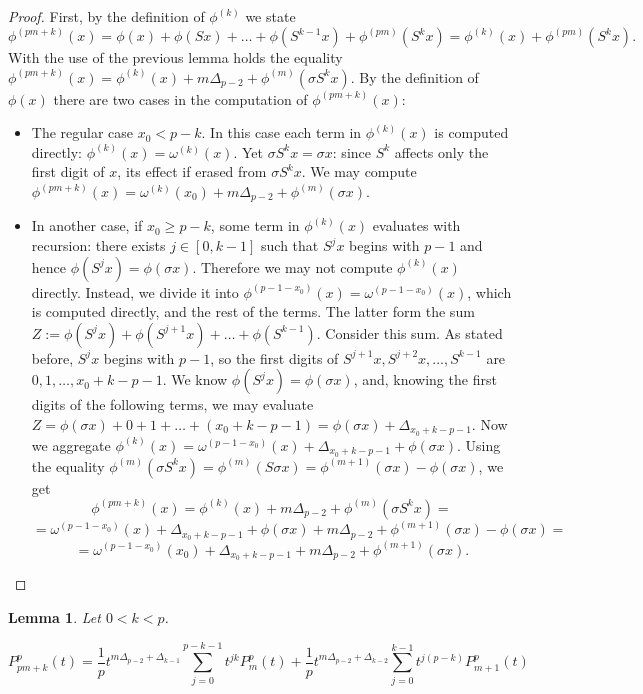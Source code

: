 \documentclass[a4paper]{article}
\theoremstyle{plain}
\newtheorem{lemma}{Lemma}[section]
\theoremstyle{definition}
\begin{document}
\begin{proof}
First, by the definition of $\phi^(k)$ we state $$\phi^{(pm+k)}(x) = \phi(x) + \phi(Sx) + \ldots + \phi(S^{k-1}x) + \phi^{(pm)}(S^k x)= \phi^{(k)}(x) + \phi^{(pm)}(S^k x).$$
With the use of the previous lemma holds the equality $\phi^{(pm+k)}(x) =  \phi^{(k)}(x) + m\Delta_{p-2} + \phi^{(m)}(\sigma S^k x)$.
By the definition of $\phi(x)$ there are two cases in the computation of $\phi^{(pm+k)}(x)$:
\begin{itemize}
\item The regular case $x_0 < p-k $. In this case each term in $\phi^{(k)}(x)$ is computed directly: $\phi^{(k)}(x) = \omega^{(k)}(x)$. Yet $\sigma S^k x = \sigma x$: since $S^k$ affects only the first digit of $x$, its effect if erased from $\sigma S^k x$. We may compute $\phi^{(pm+k)}(x)=\omega^{(k)}(x_0)+m\Delta_{p-2}+\phi^{(m)}(\sigma x)$.
\item In another case, if $x_0 \ge p-k $, some term  in $\phi^{(k)}(x)$ evaluates with recursion: there exists $j \in [0,k-1]$ such that $S^j x$ begins with $p-1$ and hence $\phi(S^j x) = \phi(\sigma x)$. Therefore we may not compute $\phi^{(k)}(x)$ directly. Instead, we divide it into $\phi^{(p-1-x_0)}(x)=\omega^{(p-1-x_0)}(x)$, which is computed directly, and the rest of the terms. The latter form the sum $Z := \phi(S^j x) + \phi(S^{j+1}x) + \ldots + \phi(S^{k-1})$. Consider this sum. As stated before, $S^j x$ begins with $p-1$, so the first digits of $S^{j+1}x, S^{j+2}x, \ldots, S^{k-1}$ are $0,1,\ldots, x_0+k-p-1$. We know $\phi(S^j x) = \phi(\sigma x)$, and, knowing the first digits of the following terms, we may evaluate $Z = \phi(\sigma x) + 0 + 1 + \ldots + (x_0+k-p-1) =  \phi(\sigma x) + \Delta_{x_0+k-p-1}$. Now we aggregate $\phi^{(k)}(x)=\omega^{(p-1-x_0)}(x) + \Delta_{x_0+k-p-1}+\phi(\sigma x)$. Using the equality $\phi^{(m)}(\sigma S^k x) = \phi^{(m)}(S\sigma x) = \phi^{(m+1)}(\sigma x) - \phi(\sigma x)$, we get 
$$\phi^{(pm+k)}(x) =  \phi^{(k)}(x) + m\Delta_{p-2} + \phi^{(m)}(\sigma S^k x) = $$ $$ = \omega^{(p-1-x_0)}(x) + \Delta_{x_0+k-p-1}+\phi(\sigma x)+ m\Delta_{p-2} + \phi^{(m+1)}(\sigma x) - \phi(\sigma x) = $$ $$ = \omega^{(p-1-x_0)}(x_0) + \Delta_{x_0+k-p-1}+m\Delta_{p-2}+\phi^{(m+1)}(\sigma x).$$
\end{itemize}
\end{proof}
\begin{lemma} \label{complexCase}
Let $0 < k < p$.

$$P_{pm+k}^p(t)  =   \frac{1}{p} t^{m\Delta_{p-2} + \Delta_{k-1}}\sum\limits_{j=0}^{p-k-1} t^{jk} P_m^p(t) 
      + \frac{1}{p} t^{m\Delta_{p-2} + \Delta_{k-2}}\sum\limits_{j=0}^{k-1} t^{j(p-k)} P_{m+1}^p(t) $$
\end{lemma}
\end{document}
